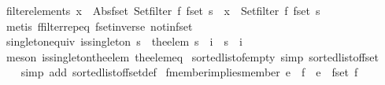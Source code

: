 \begin{isabellebody}
%
\endisadelimproof
\isanewline
{}\isamarkupfalse%
\ filter{\isacharunderscore}elements{\isacharcolon}\ {\isachardoublequoteopen}x\ {\isacharbar}{\isasymin}{\isacharbar}\ Abs{\isacharunderscore}fset\ {\isacharparenleft}Set{\isachardot}filter\ f\ {\isacharparenleft}fset\ s{\isacharparenright}{\isacharparenright}\ {\isacharequal}\ {\isacharparenleft}x\ {\isasymin}\ {\isacharparenleft}Set{\isachardot}filter\ f\ {\isacharparenleft}fset\ s{\isacharparenright}{\isacharparenright}{\isacharparenright}{\isachardoublequoteclose}\isanewline
%
\isadelimproof
\ \ %
\endisadelimproof
%
\isatagproof
{}\isamarkupfalse%
\ {\isacharparenleft}metis\ ffilter{\isachardot}rep{\isacharunderscore}eq\ fset{\isacharunderscore}inverse\ notin{\isacharunderscore}fset{\isacharparenright}%
\endisatagproof
{\isafoldproof}%
%
\isadelimproof
\isanewline
%
\endisadelimproof
\isanewline
{}\isamarkupfalse%
\ singleton{\isacharunderscore}equiv{\isacharcolon}\ {\isachardoublequoteopen}is{\isacharunderscore}singleton\ s\ {\isasymLongrightarrow}\ {\isacharparenleft}the{\isacharunderscore}elem\ s\ {\isacharequal}\ i{\isacharparenright}\ {\isacharequal}\ {\isacharparenleft}s\ {\isacharequal}\ {\isacharbraceleft}i{\isacharbraceright}{\isacharparenright}{\isachardoublequoteclose}\isanewline
%
\isadelimproof
\ \ %
\endisadelimproof
%
\isatagproof
{}\isamarkupfalse%
\ {\isacharparenleft}meson\ is{\isacharunderscore}singleton{\isacharunderscore}the{\isacharunderscore}elem\ the{\isacharunderscore}elem{\isacharunderscore}eq{\isacharparenright}%
\endisatagproof
{\isafoldproof}%
%
\isadelimproof
\isanewline
%
\endisadelimproof
\isanewline
{}\isamarkupfalse%
\ sorted{\isacharunderscore}list{\isacharunderscore}of{\isacharunderscore}empty\ {\isacharbrackleft}simp{\isacharbrackright}{\isacharcolon}\ {\isachardoublequoteopen}sorted{\isacharunderscore}list{\isacharunderscore}of{\isacharunderscore}fset\ {\isacharbraceleft}{\isacharbar}{\isacharbar}{\isacharbraceright}\ {\isacharequal}\ {\isacharbrackleft}{\isacharbrackright}{\isachardoublequoteclose}\isanewline
%
\isadelimproof
\ \ %
\endisadelimproof
%
\isatagproof
{}\isamarkupfalse%
\ {\isacharparenleft}simp\ add{\isacharcolon}\ sorted{\isacharunderscore}list{\isacharunderscore}of{\isacharunderscore}fset{\isacharunderscore}def{\isacharparenright}%
\endisatagproof
{\isafoldproof}%
%
\isadelimproof
\isanewline
%
\endisadelimproof
\isanewline
{}\isamarkupfalse%
\ fmember{\isacharunderscore}implies{\isacharunderscore}member{\isacharcolon}\ {\isachardoublequoteopen}e\ {\isacharbar}{\isasymin}{\isacharbar}\ f\ {\isasymLongrightarrow}\ e\ {\isasymin}\ fset\ f{\isachardoublequoteclose}\isanewline

\end{isabellebody}
